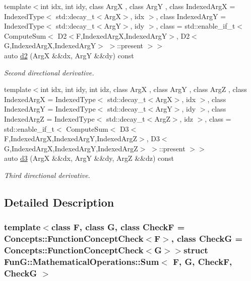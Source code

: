 \begin{DoxyCompactItemize}
{\footnotesize template$<$int idx, int idy, class Arg\-X , class Arg\-Y , class Indexed\-Arg\-X  = \-Indexed\-Type$<$ std\-::decay\-\_\-t$<$\-Arg\-X$>$, idx $>$, class Indexed\-Arg\-Y  = \-Indexed\-Type$<$ std\-::decay\-\_\-t$<$\-Arg\-Y$>$, idy $>$, class  = std\-::enable\-\_\-if\-\_\-t$<$ Compute\-Sum$<$ D2$<$\-F,\-Indexed\-Arg\-X,\-Indexed\-Arg\-Y$>$, D2$<$\-G,\-Indexed\-Arg\-X,\-Indexed\-Arg\-Y$>$ $>$\-::present $>$$>$ }\\auto \hyperlink{structFunG_1_1MathematicalOperations_1_1Sum_a2852f378176e93564ad85fa39331e21d}{d2} (\-Arg\-X \&\&dx, \-Arg\-Y \&\&dy) const 
\begin{DoxyCompactList}\small\item\em \-Second directional derivative. \end{DoxyCompactList}\item 
{\footnotesize template$<$int idx, int idy, int idz, class Arg\-X , class Arg\-Y , class Arg\-Z , class Indexed\-Arg\-X  = \-Indexed\-Type$<$ std\-::decay\-\_\-t$<$\-Arg\-X$>$, idx $>$, class Indexed\-Arg\-Y  = \-Indexed\-Type$<$ std\-::decay\-\_\-t$<$\-Arg\-Y$>$, idy $>$, class Indexed\-Arg\-Z  = \-Indexed\-Type$<$ std\-::decay\-\_\-t$<$\-Arg\-Z$>$, idz $>$, class  = std\-::enable\-\_\-if\-\_\-t$<$ Compute\-Sum$<$ D3$<$\-F,\-Indexed\-Arg\-X,\-Indexed\-Arg\-Y,\-Indexed\-Arg\-Z$>$, D3$<$\-G,\-Indexed\-Arg\-X,\-Indexed\-Arg\-Y,\-Indexed\-Arg\-Z$>$ $>$\-::present $>$$>$ }\\auto \hyperlink{structFunG_1_1MathematicalOperations_1_1Sum_a03b4ee4cb48bf45992bef43322982635}{d3} (\-Arg\-X \&\&dx, \-Arg\-Y \&\&dy, \-Arg\-Z \&\&dz) const 
\begin{DoxyCompactList}\small\item\em \-Third directional derivative. \end{DoxyCompactList}\end{DoxyCompactItemize}


\subsection{\-Detailed \-Description}
\subsubsection*{template$<$class F, class G, class Check\-F = \-Concepts\-::\-Function\-Concept\-Check$<$\-F$>$, class Check\-G = \-Concepts\-::\-Function\-Concept\-Check$<$\-G$>$$>$struct Fun\-G\-::\-Mathematical\-Operations\-::\-Sum$<$ F, G, Check\-F, Check\-G $>$}

